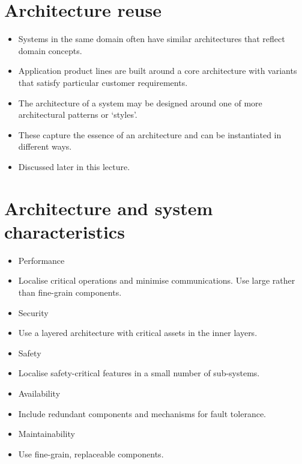 \section{Architecture reuse}
\begin{itemize}
\item Systems in the same domain often have similar architectures that reflect domain concepts.

\item Application product lines are built around a core architecture with variants that satisfy particular customer requirements.

\item The architecture of a system may be designed around one of more architectural patterns or ‘styles’.

 \item These capture the essence of an architecture and can be instantiated in different ways.
 \item Discussed later in this lecture.

\end{itemize}
\section{Architecture and system characteristics}
\begin{itemize}
\item Performance

 \item Localise critical operations and minimise communications. Use large rather than fine-grain components.

\item Security

 \item Use a layered architecture with critical assets in the inner layers. \item Safety
 \item Localise safety-critical features in a small number of sub-systems. \item Availability
 \item Include redundant components and mechanisms for fault tolerance.

\item Maintainability

 \item Use fine-grain, replaceable components.
\end{itemize}
